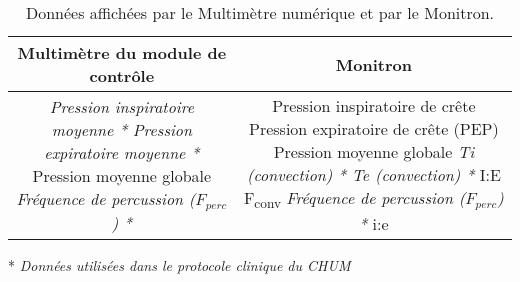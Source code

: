 \begin{table*}
	\centering
	\caption{Données affichées par le Multimètre numérique et par le Monitron. }
	\begin{tabular}{cc}
		\hline
		Multimètre du module de contrôle & Monitron \\
		\hline
		\parbox{16em}{
			\raggedright
			\emph{Pression inspiratoire moyenne *}\\
			\emph{Pression expiratoire moyenne *}\\
			Pression moyenne globale\\
			\emph{Fréquence de percussion ($F_{perc}$) *
			}
			} & \parbox{16em}{
				\raggedright
				Pression inspiratoire de crête\\
				Pression expiratoire de crête (PEP)\\
				Pression moyenne globale\\
				\emph{Ti (convection) *}\\
				\emph{Te (convection) *}\\
				I:E\\
				F\textsubscript{conv}\\
				\emph{Fréquence de percussion ($F_{perc}$) *}\\
				i:e
				}\\
				\hline
	\end{tabular}

	* \emph{Données utilisées dans le protocole clinique du CHUM}
\end{table*}
